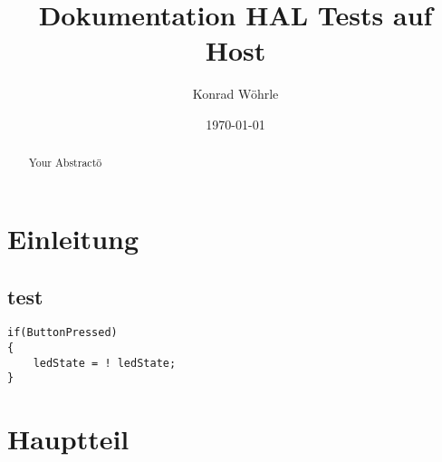 \documentclass{article}
\title{Dokumentation HAL Tests auf Host}
\author{Konrad Wöhrle}
\date{\today}
\begin{document}
\maketitle
\tableofcontents

\section{Einleitung}

\subsection{test}

\begin{verbatim}
if(ButtonPressed)
{
    ledState = ! ledState;
}
\end{verbatim}

\section{Hauptteil}

\section{}

\begin{abstract}
Your Abstractö
\end{abstract}
\end{document}

